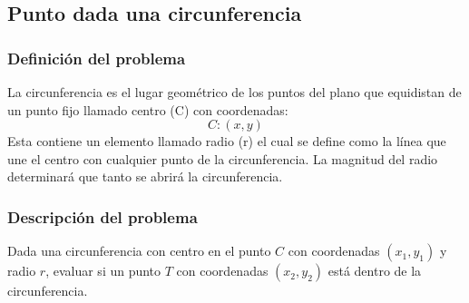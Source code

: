 \subsection{Punto dada una circunferencia}

\subsubsection{Definición del problema}
La circunferencia es el lugar geométrico de los puntos del plano que equidistan de un punto fijo llamado centro (C) con coordenadas:
$$C:(x,y)$$
Esta contiene un elemento llamado radio (r) el cual se define como la línea que une el centro con cualquier punto de la circunferencia. La magnitud del radio determinará que tanto se abrirá la circunferencia.\cite{Circunferencia}\\

\subsubsection{Descripción del problema}
Dada una circunferencia con centro en el punto $C$ con coordenadas $(x_1, y_1)$ y radio $r$, evaluar si un punto $T$ con coordenadas $(x_2, y_2)$ está dentro de la circunferencia.\\

